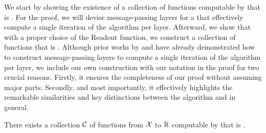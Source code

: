 We start by showing the existence of a collection of functions computable by \gnns that is \wldisc. For the proof, we will devise message-passing layers for a \gnn that effectively compute a single iteration of the \wl algorithm per layer. Afterward, we show that with a proper choice of the \textsf{Readout} function, we construct a collection of \gnn functions that is \wldisc. 
Although prior works by \cite{Morris2018} and \cite{Xu2018} have already demonstrated how to construct message-passing layers to compute a single iteration of the \wl algorithm per layer, we include our own construction with our notation in the proof for two crucial reasons. Firstly, it ensures the completeness of our proof without assuming major parts. Secondly, and most importantly, it effectively highlights the remarkable similarities and key distinctions between the \wl algorithm and \gnns in general.
\begin{lemma}\label{lem:gnn_1wl_disc}
    There exists a collection $\mathcal{C}$ of functions from $\mathcal{X}$ to $\mathbb{R}$ computable by \gnns that is \wldisc.
\end{lemma}

